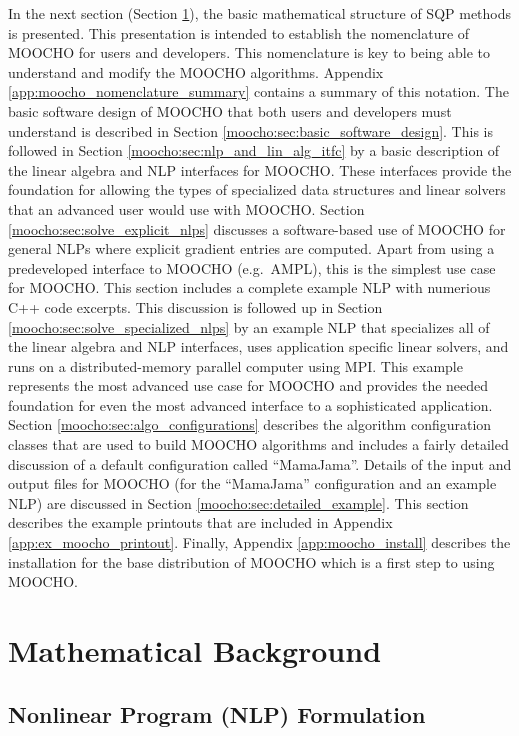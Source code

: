 \documentclass[pdf,ps2pdf,11pt]{SANDreport}
\begin{document}
In the next section (Section {}\ref{moocho:sec:sqp_background}), the basic
mathematical structure of SQP methods is presented.  This presentation is
intended to establish the nomenclature of MOOCHO for users and developers.
This nomenclature is key to being able to understand and modify the MOOCHO
algorithms.  Appendix {}\ref{app:moocho_nomenclature_summary} contains a
summary of this notation.  The basic software design of MOOCHO that both users
and developers must understand is described in Section
{}\ref{moocho:sec:basic_software_design}.  This is followed in Section
{}\ref{moocho:sec:nlp_and_lin_alg_itfc} by a basic description of the linear
algebra and NLP interfaces for MOOCHO.  These interfaces provide the
foundation for allowing the types of specialized data structures and linear
solvers that an advanced user would use with MOOCHO.  Section
{}\ref{moocho:sec:solve_explicit_nlps} discusses a software-based use of
MOOCHO for general NLPs where explicit gradient entries are computed.  Apart
from using a predeveloped interface to MOOCHO (e.g.\ AMPL), this is the
simplest use case for MOOCHO.  This section includes a complete example NLP
with numerious C++ code excerpts.  This discussion is followed up in Section
{}\ref{moocho:sec:solve_specialized_nlps} by an example NLP that specializes
all of the linear algebra and NLP interfaces, uses application specific linear
solvers, and runs on a distributed-memory parallel computer using MPI.  This
example represents the most advanced use case for MOOCHO and provides the
needed foundation for even the most advanced interface to a sophisticated
application.  Section {}\ref{moocho:sec:algo_configurations} describes the
algorithm configuration classes that are used to build MOOCHO algorithms and
includes a fairly detailed discussion of a default configuration called
``MamaJama''.  Details of the input and output files for MOOCHO (for the
``MamaJama'' configuration and an example NLP) are discussed in Section
{}\ref{moocho:sec:detailed_example}. This section describes the example
printouts that are included in Appendix {}\ref{app:ex_moocho_printout}.
Finally, Appendix {}\ref{app:moocho_install} describes the installation for
the base distribution of MOOCHO which is a first step to using MOOCHO.

%
\section{Mathematical Background}
\label{moocho:sec:sqp_background}
%

%
\subsection{Nonlinear Program (NLP) Formulation}
\label{moocho:sec:nlp_formulation}
%
\end{document}
